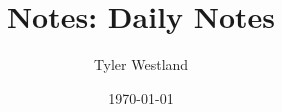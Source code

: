 \documentclass[journal]{IEEEtran}
\title{Notes: \notesDate}
\date{\notesDate}
\title{Daily Notes}
\author{Tyler Westland}
\date{\today}
\newcommand{\onlyinsubfile}[1]{#1}
\newcommand{\notinsubfile}[1]{}
\begin{document}
    \renewcommand{\onlyinsubfile}[1]{}
    \renewcommand{\notinsubfile}[1]{#1}
    
    \maketitle
    \tableofcontents 

    \clearpage

    
    
    \printbibliography
\end{document}
